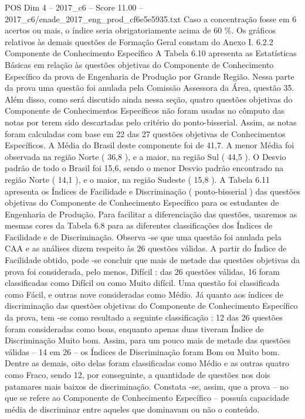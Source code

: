 \begin{textsample}{POS Dim 4 – 2017\_c6 – Score 11.00 – 2017\_c6/enade\_2017\_eng\_prod\_cf6e5e5935.txt}
Caso a concentração fosse em 6 acertos ou mais, o índice seria obrigatoriamente acima de 60 \%.
Os gráficos relativos às demais questões de Formação Geral constam do Anexo I. 6.2.2 Componente de Conhecimento Específico A Tabela 6.10 apresenta as Estatísticas Básicas em relação às questões objetivas do Componente de Conhecimento Específico da prova de Engenharia de Produção por Grande Região.
Nessa parte da prova uma questão foi anulada pela Comissão Assessora da Área, questão 35.
Além disso, como será discutido ainda nessa seção, quatro questões objetivas do Componente de Conhecimentos Específicos não foram usadas no cômputo das notas por terem sido descartadas pelo critério do ponto-bisserial.
Assim, as notas foram calculadas com base em 22 das 27 questões objetivas de Conhecimentos Específicos.
A Média do Brasil deste componente foi de 41,7.
A menor Média foi observada na região Norte ( 36,8 ), e a maior, na região Sul ( 44,5 ).
O Desvio padrão de todo o Brasil foi 15,6, sendo o menor Desvio padrão encontrado na região Norte ( 14,1 ), e o maior, na região Sudeste ( 15,8 ).
A Tabela 6.11 apresenta os Índices de Facilidade e Discriminação ( ponto-bisserial ) das questões objetivas do Componente de Conhecimento Específico para os estudantes de Engenharia de Produção.
Para facilitar a diferenciação das questões, usaremos as mesmas cores da Tabela 6.8 para as diferentes classificações dos Índices de Facilidade e de Discriminação.
Observa -se que uma questão foi anulada pela CAA e as análises dizem respeito às 26 questões válidas.
A partir do Índice de Facilidade obtido, pode -se concluir que mais de metade das questões objetivas da prova foi considerada, pelo menos, Difícil : das 26 questões válidas, 16 foram classificadas como Difícil ou como Muito difícil.
Uma questão foi classificada como Fácil, e outras nove consideradas como Médio.
Já quanto aos índices de discriminação das questões objetivas do Componente de Conhecimento Específico da prova, tem -se como resultado a seguinte classificação : 12 das 26 questões foram consideradas como boas, enquanto apenas duas tiveram Índice de Discriminação Muito bom.
Assim, para um pouco mais de metade das questões válidas – 14 em 26 – os Índices de Discriminação foram Bom ou Muito bom.
Dentre as demais, oito delas foram classificadas como Médio e as outras quatro como Fraco, sendo 12, por conseguinte, a quantidade de questões nos dois patamares mais baixos de discriminação.
Constata -se, assim, que a prova – no que se refere ao Componente de Conhecimento Específico – possuía capacidade média de discriminar entre aqueles que dominavam ou não o conteúdo.

\end{textsample}

